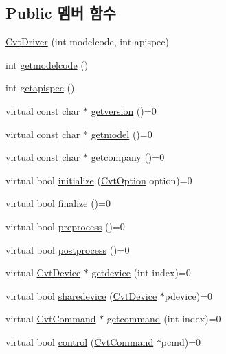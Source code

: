 \subsection*{Public 멤버 함수}
\begin{DoxyCompactItemize}
\item 
\hyperlink{classstdcvt_1_1CvtDriver_a82925971b6e8ef2ce7f0b5d113120855}{Cvt\+Driver} (int modelcode, int apispec)
\item 
int \hyperlink{classstdcvt_1_1CvtDriver_a86ffa63425176824f6b0493be4e41cda}{getmodelcode} ()
\item 
int \hyperlink{classstdcvt_1_1CvtDriver_ad6e0edc0bc47015d446215e98b7bfc2f}{getapispec} ()
\item 
virtual const char $\ast$ \hyperlink{classstdcvt_1_1CvtDriver_a8c813cb2be4b0f3bb02c99125488ac24}{getversion} ()=0
\item 
virtual const char $\ast$ \hyperlink{classstdcvt_1_1CvtDriver_a384233eb993e566102cbcc5e87db3e96}{getmodel} ()=0
\item 
virtual const char $\ast$ \hyperlink{classstdcvt_1_1CvtDriver_af77365bd31120078fa2eae4ddece3028}{getcompany} ()=0
\item 
virtual bool \hyperlink{classstdcvt_1_1CvtDriver_a71322934c5b5ad0d5b167219cd23a0bb}{initialize} (\hyperlink{classstdcvt_1_1CvtOption}{Cvt\+Option} option)=0
\item 
virtual bool \hyperlink{classstdcvt_1_1CvtDriver_a22b39da5aafabec2ee9677ed138256e9}{finalize} ()=0
\item 
virtual bool \hyperlink{classstdcvt_1_1CvtDriver_ac15259a26d652d46c198307886d52257}{preprocess} ()=0
\item 
virtual bool \hyperlink{classstdcvt_1_1CvtDriver_a4bcae9e7c58d989a645a74d21e2fc5ea}{postprocess} ()=0
\item 
virtual \hyperlink{classstdcvt_1_1CvtDevice}{Cvt\+Device} $\ast$ \hyperlink{classstdcvt_1_1CvtDriver_adc2ce5ff6fe2426fd84ce3ae69731704}{getdevice} (int index)=0
\item 
virtual bool \hyperlink{classstdcvt_1_1CvtDriver_aeedcd62d3b6ed95f0584db5a7259f642}{sharedevice} (\hyperlink{classstdcvt_1_1CvtDevice}{Cvt\+Device} $\ast$pdevice)=0
\item 
virtual \hyperlink{classstdcvt_1_1CvtCommand}{Cvt\+Command} $\ast$ \hyperlink{classstdcvt_1_1CvtDriver_ad0378635152f2e35c0686c4fe92996e6}{getcommand} (int index)=0
\item 
virtual bool \hyperlink{classstdcvt_1_1CvtDriver_ac289321a67d660f5514c4ddfaa238ade}{control} (\hyperlink{classstdcvt_1_1CvtCommand}{Cvt\+Command} $\ast$pcmd)=0
\end{DoxyCompactItemize}


